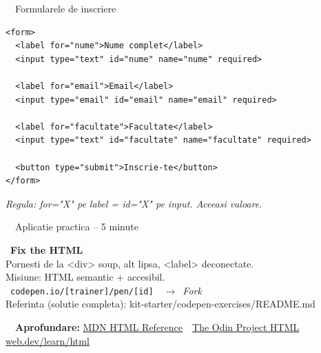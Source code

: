 \documentclass[aspectratio=169,11pt]{beamer}
\newcommand{\setaccent}[1]{\colorlet{accent}{#1}}
\newcommand{\code}[1]{{\ttfamily\small\color{accent!85!black}#1}}
\begin{document}
\begin{frame}[fragile]{\textcolor{themeHtml}{\faCode}\ \ Formularele de inscriere}
\vspace{6pt}
\begin{lstlisting}[style=html]
<form>
  <label for="nume">Nume complet</label>
  <input type="text" id="nume" name="nume" required>

  <label for="email">Email</label>
  <input type="email" id="email" name="email" required>

  <label for="facultate">Facultate</label>
  <input type="text" id="facultate" name="facultate" required>

  <button type="submit">Inscrie-te</button>
</form>
\end{lstlisting}

\vspace{4pt}
{\footnotesize\color{textDim}\itshape Regula: \code{for="X"} pe label = \code{id="X"} pe input. Aceeasi valoare.}
\end{frame}

\begin{frame}{\textcolor{themeHtml}{\faGamepad}\ \ Aplicatie practica -- 5 minute}
  \vspace{20pt}
  \begin{joculet}
    {\large\color{themeHtml}\faGamepad\ \textbf{Fix the HTML}}\\[6pt]
    Pornesti de la \code{<div>} soup, \code{alt} lipsa, \code{<label>} deconectate.\\
    Misiune: HTML semantic + accesibil.\\[8pt]
    {\color{themeHtml}\faLink\ \texttt{codepen.io/[trainer]/pen/[id]}\ \ $\to$\ \emph{Fork}}\\[4pt]
    {\footnotesize\color{textDim}Referinta (solutie completa): \code{kit-starter/codepen-exercises/README.md}}
  \end{joculet}

  \vspace{12pt}
  {\footnotesize\color{textDim}\faGraduationCap\ \ \textbf{Aprofundare:} \href{https://developer.mozilla.org/en-US/docs/Web/HTML/Element}{MDN HTML Reference} \,\textbullet\, \href{https://www.theodinproject.com/paths/foundations/courses/foundations\#html-foundations}{The Odin Project HTML} \,\textbullet\, \href{https://web.dev/learn/html}{web.dev/learn/html}}
\end{frame}

\setaccent{themeCss}
\end{document}

